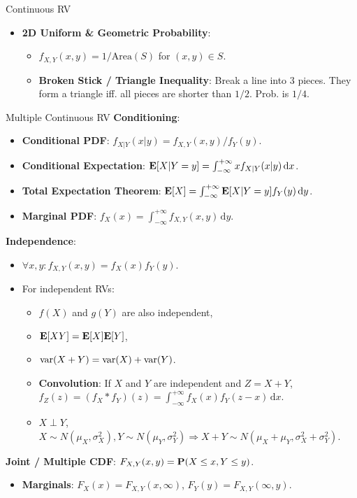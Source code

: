 \documentclass[landscape,a4paper]{article}
\begin{document}
\begin{cheatsheetcolumns}
\begin{card}{Continuous RV}
\begin{itemize}
				\item \textbf{2D Uniform \& Geometric Probability}:
				\begin{itemize}
					\item $f_{X,Y}(x,y) = 1/\text{Area}(S)$ for $(x,y) \in S$.
					\item \textbf{Broken Stick / Triangle Inequality}: Break a line into 3 pieces. They form a triangle iff. all pieces are shorter than $1/2$. Prob. is $1/4$.
				\end{itemize}
			\end{itemize}
		\end{card}
		\begin{card}{Multiple Continuous RV}
			\textbf{Conditioning}:
			\begin{itemize}
				\item \textbf{Conditional PDF}: $f_{X|Y}(x|y)=f_{X,Y}(x,y)/f_{Y}(y)$.
				\item \textbf{Conditional Expectation}: $\mathbf{E}[X|Y=y]=\int_{-\infty}^{+\infty}xf_{X|Y}(x|y)\,\mathrm dx$.
				\item \textbf{Total Expectation Theorem}: $\mathbf{E}[X]=\int_{-\infty}^{+\infty}\mathbf{E}[X|Y=y]f_Y(y)\,\mathrm dy$.
				\item \textbf{Marginal PDF}: $f_X(x)=\int_{-\infty}^{+\infty} f_{X,Y}(x,y)\,\mathrm dy$.
			\end{itemize}
			\textbf{Independence}:
			\begin{itemize}
				\item $\forall x,y\colon f_{X,Y}(x,y)=f_X(x)f_Y(y)$.
				\item For independent RVs:
				\begin{itemize}
					\item $f(X)$ and $g(Y)$ are also independent,
					\item $\mathbf{E}[XY]=\mathbf{E}[X]\mathbf{E}[Y]$,
					\item $\operatorname{var}(X+Y)=\operatorname{var}(X)+\operatorname{var}(Y)$.
					\item \textbf{Convolution}: If $X$ and $Y$ are independent and $Z=X+Y$, $f_Z(z)=(f_X\ast f_Y)(z)=\int_{-\infty}^{+\infty}f_X(x)f_Y(z-x)\,\mathrm dx$.
					\item $X\perp Y$, $X\sim N(\mu_X,\sigma_X^2),Y\sim N(\mu_Y,\sigma_Y^2)\Rightarrow X+Y\sim N(\mu_X+\mu_Y,\sigma_X^2+\sigma_Y^2)$.
				\end{itemize}
			\end{itemize}
			\textbf{Joint / Multiple CDF}: $F_{X,Y}(x,y) = \mathbf{P}(X \le x, Y \le y)$.
			\begin{itemize}
				\item \textbf{Marginals}: $F_X(x) = F_{X,Y}(x, \infty)$, $F_Y(y) = F_{X,Y}(\infty, y)$.

\end{itemize}
\end{card}
\end{cheatsheetcolumns}
\end{document}
